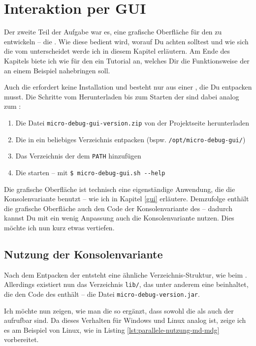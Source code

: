 \chapter{Interaktion per GUI}
\label{bed-gui}
Der zweite Teil der Aufgabe war es, eine grafische Oberfläche für den \md{} zu entwickeln -- die \mdg{}. Wie diese bedient wird, worauf Du achten solltest und wie sich die \mdg{} vom \md{} unterscheidet werde ich in diesem Kapitel erläutern. Am Ende des Kapitels biete ich wie für den \md{} ein Tutorial an, welches Dir die Funktionsweise der \mdg{} an einem Beispiel nahebringen soll.

Auch die \mdg{} erfordert keine Installation und besteht nur aus einer , die Du entpacken musst. Die Schritte vom Herunterladen bis zum Starten der \mdg{} sind dabei analog zum \md{}:

\begin{enumerate}
\item Die Datei \texttt{micro-debug-gui-version.zip} von der Projektseite herunterladen
\item Die  in ein beliebiges Verzeichnis entpacken (bspw. \texttt{/opt/micro-debug-gui/})
\item Das Verzeichnis der \mdg{} dem \texttt{PATH} hinzufügen
\item Die \mdg{} starten -- mit \texttt{\$ micro-debug-gui.sh -{}-help}
\end{enumerate}

Die grafische Oberfläche ist technisch eine eigenständige Anwendung, die die Konsolenvariante benutzt -- wie ich in Kapitel \ref{gui} erläutere. Demzufolge enthält die grafische Oberfläche auch den Code der Konsolenvariante des \md{} -- dadurch kannst Du mit ein wenig Anpassung auch die Konsolenvariante nutzen. Dies möchte ich nun kurz etwas vertiefen.

\section{Nutzung der Konsolenvariante}
Nach dem Entpacken der  entsteht eine ähnliche Verzeichnis-Struktur, wie beim \md{}. Allerdings existiert nun das Verzeichnis \texttt{lib/}, das unter anderem eine  beinhaltet, die den Code des \md{} enthält -- die Datei \texttt{micro-debug-version.jar}.

Ich möchte nun zeigen, wie man die \mdg{} so ergänzt, dass sowohl die \mdg{} als auch der \md{} aufrufbar sind. Da dieses Verhalten für Windows und Linux analog ist, zeige ich es am Beispiel von Linux, wie in Listing \ref{lst:parallele-nutzung-md-mdg} vorbereitet.

